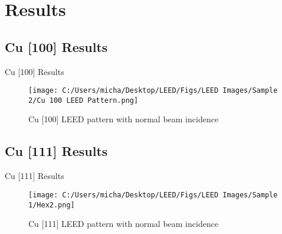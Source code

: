 \documentclass[11pt]{beamer}
\begin{document}
\section{Results}

\subsection{Cu [100] Results}
\begin{frame}{Cu [100] Results}
    \begin{figure}
        \centering
        \texttt{[image: C:/Users/micha/Desktop/LEED/Figs/LEED Images/Sample 2/Cu 100 LEED Pattern.png]}
        \caption{Cu [100] LEED pattern with normal beam incidence}
    \end{figure}
\end{frame}

\subsection{Cu [111] Results}
\begin{frame}{Cu [111] Results}
    \begin{figure}
        \centering
        \texttt{[image: C:/Users/micha/Desktop/LEED/Figs/LEED Images/Sample 1/Hex2.png]}
        \caption{Cu [111] LEED pattern with normal beam incidence}
    \end{figure}
\end{frame}
\end{document}
